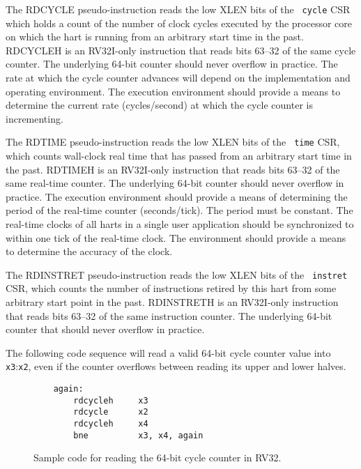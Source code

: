 The RDCYCLE pseudo-instruction reads the low XLEN bits of the {\tt
  cycle} CSR which holds a count of the number of clock cycles
executed by the processor core on which the hart is running from
an arbitrary start time in the past.  RDCYCLEH is
an RV32I-only instruction that reads bits 63--32 of the same cycle
counter.  The underlying 64-bit counter should never overflow in
practice.  The rate at which the cycle counter advances will depend on
the implementation and operating environment.  The execution
environment should provide a means to determine the current rate
(cycles/second) at which the cycle counter is incrementing.

The RDTIME pseudo-instruction reads the low XLEN bits of the {\tt
  time} CSR, which counts wall-clock real time that has passed from an
arbitrary start time in the past.  RDTIMEH is an RV32I-only instruction
that reads bits 63--32 of the same real-time counter.  The underlying 64-bit
counter should never overflow in practice.  The execution environment
should provide a means of determining the period of the real-time
counter (seconds/tick).  The period must be constant.  The
real-time clocks of all harts in a single user application
should be synchronized to within one tick of the real-time clock.  The
environment should provide a means to determine the accuracy of the
clock.

The RDINSTRET pseudo-instruction reads the low XLEN bits of the {\tt
  instret} CSR, which counts the number of instructions retired by
this hart from some arbitrary start point in the past.  RDINSTRETH is
an RV32I-only instruction that reads bits 63--32 of the same
instruction counter. The underlying 64-bit counter that should never
overflow in practice.

The following code sequence will read a valid 64-bit cycle counter value into
{\tt x3}:{\tt x2}, even if the counter overflows between reading its upper
and lower halves.

\begin{figure}[h!]
\begin{center}
\begin{verbatim}
    again:
        rdcycleh     x3
        rdcycle      x2
        rdcycleh     x4
        bne          x3, x4, again
\end{verbatim}
\end{center}
\caption{Sample code for reading the 64-bit cycle counter in RV32.}
\label{critical}
\end{figure}


